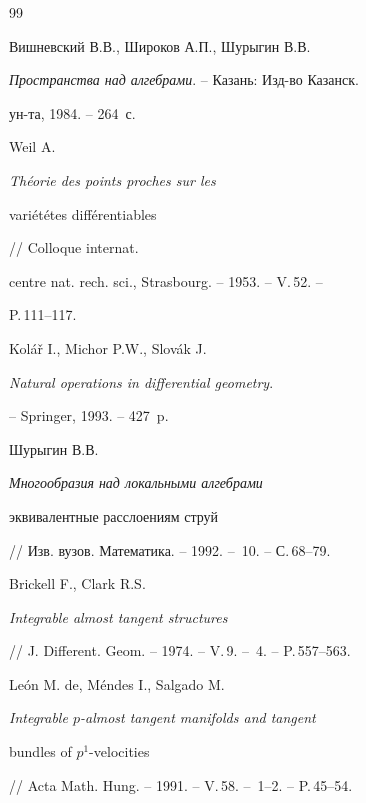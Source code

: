 \begin{thebibliography}{99}


Вишневский В.В., Широков А.П., Шурыгин В.В.


{\it Пространства над алгебрами}. -- Казань: Изд-во Казанск.


ун-та, 1984. -- 264~с.







Weil A. {\it Th\'eorie des points proches sur les


vari\'et\'etes diff\'erentiables} // Colloque internat.


centre nat. rech. sci.,  Strasbourg. -- 1953. -- V.\,52. --


P.\,111--117.







Kol\'a\v r I., Michor P.W., Slov\'ak J.


{\it Natural operations in differential geometry}.


-- Springer, 1993. -- 427~p.







Шурыгин В.В.


{\it Многообразия  над  локальными   алгебрами


эквивалентные  расслоениям струй}


// Изв. вузов. Математика. -- 1992. -- \No\,10. -- С.\,68--79.







Brickell F., Clark R.S.


{\it Integrable almost tangent structures}


// J. Different. Geom. -- 1974. -- V.\,9. -- \No\,4. -- P.\,557--563.







Le\'on M. de, M\'endes I., Salgado M.


{\it Integrable $p$-almost tangent manifolds and tangent


bundles of $p^1$-velocities}


// Acta  Math. Hung. -- 1991. -- V.\,58. -- \No\,1--2. -- P.\,45--54.






\end{thebibliography}
